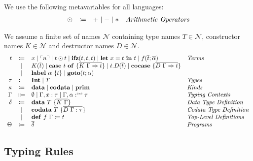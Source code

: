 \begin{definition}
  We use the following metavariables for all languages:
  \[
    \begin{array}{rcll}
      \odot  & \coloneqq & + \mid - \mid * & \emph{Arithmetic Operators}
    \end{array}
  \]
\end{definition}

\begin{definition}
  We assume a finite set of names $\mathcal{N}$ containing type names $T\in\mathcal{N}$, constructor names $K\in\mathcal{N}$ and destructor names $D\in\mathcal{N}$.
  \[ 
    \begin{array}{r c l l}
      t & \coloneqq & x \mid \lit{n} \mid t \odot t \mid \ifz{t}{t}{t} \mid \letin{x}{t}{t} \mid f(\overline{t}; \overline{\alpha}) & \emph{Terms}\\
      & \mid & K(\overline{t}) \mid \caseof{t}{\overline{K\ \Gamma \Rightarrow t}} \mid t.D(\overline{t}) \mid \cocase{\overline{D\ \Gamma \Rightarrow t}} & \\
      & \mid & \lab{\alpha}{t} \mid \goto{t}{\alpha} & \\
      \tau & \coloneqq & \tyint \mid T & \emph{Types} \\
      \kappa & \coloneq & \mathbf{data} \mid \mathbf{codata} \mid \mathbf{prim} & \emph{Kinds} \\
      \Gamma & \Coloneqq & \emptyset \mid \Gamma, x : \tau \mid \Gamma, \alpha \cnt \tau & \emph{Typing Contexts} \\
      \delta & \coloneqq & \mathbf{data}\ T\ \{ \overline{K\ \Gamma} \} & \emph{Data Type Definition}\\
       & \mid & \mathbf{codata}\ T\ \{ \overline{D\ \Gamma : \tau}\} & \emph{Codata Type Definition}\\
       & \mid & \defi{f\ \Gamma}{t} & \emph{Top-Level Definitions}\\
      \Theta & \coloneqq & \overline{\delta} & \emph{Programs}\\
    \end{array}
  \]
\end{definition}

\subsection{Typing Rules}
\label{subsec:fun:typing-rules}



